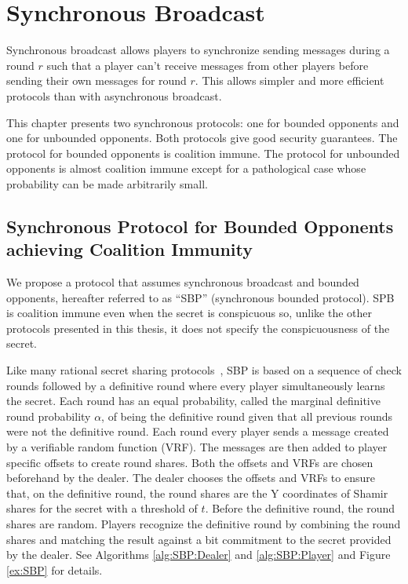 \documentclass[12pt]{dalcsthesis}
\begin{document}
\chapter{Synchronous Broadcast}
\label{chapter:Synchronous}

Synchronous broadcast allows players to synchronize sending messages during a round $r$ such that a player can't receive messages from other players before sending their own messages for round $r$. This allows simpler and more efficient protocols than with asynchronous broadcast.

This chapter presents two synchronous protocols: one for bounded opponents and one for unbounded opponents. Both protocols give good security guarantees. The protocol for bounded opponents is coalition immune. The protocol for unbounded opponents is almost coalition immune except for a pathological case whose probability can be made arbitrarily small.



\section{Synchronous Protocol for Bounded Opponents achieving Coalition Immunity}

We propose a protocol that assumes synchronous broadcast and bounded opponents, hereafter referred to as ``SBP'' (synchronous bounded protocol). SPB is coalition immune even when the secret is conspicuous so, unlike the other protocols presented in this thesis, it does not specify the conspicuousness of the secret.

Like many rational secret sharing protocols~\cite{fuch10, halpern04, kol08}, SBP is based on a sequence of check rounds followed by a definitive round where every player simultaneously learns the secret. Each round has an equal probability, called the marginal definitive round probability $\alpha$, of being the definitive round given that all previous rounds were not the definitive round. Each round every player sends a message created by a verifiable random function (VRF). The messages are then added to player specific offsets to create round shares. Both the offsets and VRFs are chosen beforehand by the dealer. The dealer chooses the offsets and VRFs to ensure that, on the definitive round, the round shares are the Y coordinates of Shamir shares for the secret with a threshold of $t$. Before the definitive round, the round shares are random. Players recognize the definitive round by combining the round shares and matching the result against a bit commitment to the secret provided by the dealer. See Algorithms \ref{alg:SBP:Dealer} and \ref{alg:SBP:Player} and Figure \ref{ex:SBP} for details.
\end{document}
